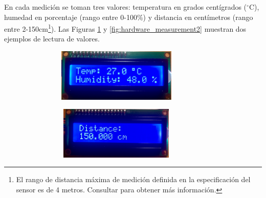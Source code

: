 \documentclass[12pt,a4paper, twoside]{report}
\begin{document}
	En cada medición se toman tres valores: temperatura en grados centígrados ($^{\circ}$C), humedad en porcentaje (rango entre 0-100\%) y distancia en centímetros (rango entre 2-150cm\footnote{El rango de distancia máxima de medición definida en la especificación del \gls{sensor} es de 4 metros. Consultar \cite{hcsr04:datasheet} para obtener más información.}). Las Figuras \ref{fig:hardware_measurement} y \ref{fig:hardware_measurement2} muestran dos ejemplos de lectura de valores. \\
	
	\begin{figure}[!ht]		
		\caption{Prototipo hardware Hyot - Ejemplo de medición.}
 		\begin{subfigure}{0.5\textwidth}
 			\hbox{
 				\hspace{0cm}
 				\includegraphics[width=7cm, height=2.5cm]{Images/hardware/lcd1_measurement} 
 			}
		\end{subfigure}
		\begin{subfigure}{0.5\textwidth}
			\hbox{
 				\hspace{1cm}
				\includegraphics[width=7cm, height=2.5cm]{Images/hardware/lcd2_measurement}
			}
		\end{subfigure}
		\label{fig:hardware_measurement}
	\end{figure}
	
\end{document}
